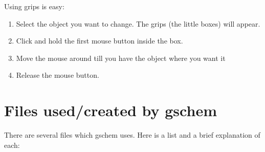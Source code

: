 \documentclass{article}
\begin{document}
Using grips is easy:
\begin{enumerate}
\item Select the object you want to change.  The grips (the little
  boxes) will appear.
  
\item Click and hold the first mouse button inside the box.
        
\item Move the mouse around till you have the object where you want it
  
\item Release the mouse button.
\end{enumerate}

\section{Files used/created by gschem}
There are several files which gschem uses.  Here is a list and a brief
explanation of each:
\end{document}
